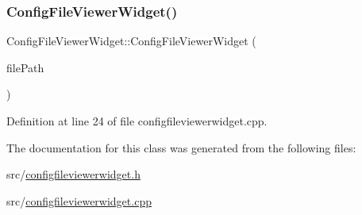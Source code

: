 \subsubsection{\texorpdfstring{ConfigFileViewerWidget()}{ConfigFileViewerWidget()}}
{\footnotesize\ttfamily Config\+File\+Viewer\+Widget\+::\+Config\+File\+Viewer\+Widget (\begin{DoxyParamCaption}\item[{Q\+String}]{file\+Path }\end{DoxyParamCaption})}



Definition at line 24 of file configfileviewerwidget.\+cpp.



The documentation for this class was generated from the following files\+:\begin{DoxyCompactItemize}
\item 
src/\mbox{\hyperlink{configfileviewerwidget_8h}{configfileviewerwidget.\+h}}\item 
src/\mbox{\hyperlink{configfileviewerwidget_8cpp}{configfileviewerwidget.\+cpp}}\end{DoxyCompactItemize}
